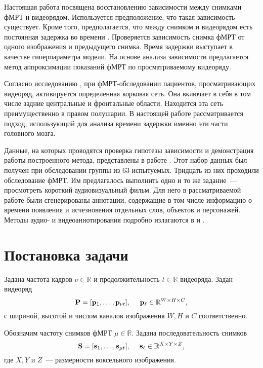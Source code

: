 \documentclass[a4paper, 12pt]{extarticle}
\begin{document}
Настоящая работа посвящена восстановлению зависимости между снимками фМРТ и видеорядом.
Используется предположение, что такая зависимость существует.
Кроме того, предполагается, что между снимком и видеорядом есть постоянная задержка во времени
\citep{Logothetis2003}.
Проверяется зависимость снимка фМРТ от одного изображения и предыдущего снимка.
Время задержки выступает в качестве гиперпараметра модели.
На основе анализа зависимости предлагается метод аппроксимации показаний фМРТ по
просматриваемому видеоряду.

Согласно исследованию \citep{anderson2006}, при фМРТ-обследовании пациентов,
просматривающих видеоряд, активируется определенная корковая сеть. Она включает
в себя в том числе задние центральные и фронтальные области. Находится эта сеть
преимущественно в правом полушарии. В настоящей работе рассматривается подход,
использующий для анализа времени задержки именно эти части головного мозга.

Данные, на которых проводятся проверка гипотезы зависимости и демонстрация работы построенного
метода, представлены в работе \citep{Berezutskaya2022}. Этот набор данных был получен при
обследовании группы из 63 испытуемых. Тридцать из них проходили обследование фМРТ.
Им предлагалось выполнить одно и то же задание~--- просмотреть короткий аудиовизуальный фильм.
Для него в рассматриваемой работе были сгенерированы аннотации, содержащие в том числе информацию о времени появления и исчезновения
отдельных слов, объектов и персонажей. Методы аудио- и видеоаннотирования подробно излагаются в
\citep{boersma2018praat} и \citep{Berezutskaya2020}.

\section{Постановка задачи}

Задана частота кадров $\nu \in \mathbb{R}$ и продолжительность $t \in \mathbb{R}$ видеоряда.
Задан видеоряд
\begin{equation}
	\label{eq1}
	\mathbf{P} = [\mathbf{p}_1, \ldots, \mathbf{p}_{\nu t}], \quad\
	\mathbf{p}_{\ell} \in \mathbb{R}^{W \times H \times C},
\end{equation}
с шириной, высотой и числом каналов изображения $W, H$ и
$C$ соответственно.

Обозначим частоту снимков фМРТ $\mu \in \mathbb{R}$. Задана последовательность снимков
\begin{equation}
	\label{eq2}
	\mathbf{S} = [\mathbf{s}_1, \ldots, \mathbf{s}_{\mu t}], \quad\
	\mathbf{s}_{\ell} \in \mathbb{R}^{X \times Y \times Z},
\end{equation}
где $X, Y$ и $Z$~--- размерности воксельного изображения.
\end{document}
